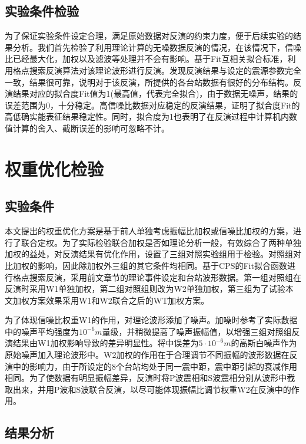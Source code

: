 \subsection{实验条件检验}
为了保证实验条件设定合理，满足原始数据对反演的约束力度，便于后续实验的结果分析。我们首先检验了利用理论计算的无噪数据反演的情况，在该情况下，信噪比已经最大化，加权以及滤波等处理并不会有影响。基于Fit互相关拟合标准，利用格点搜索反演算法对该理论波形进行反演。发现反演结果与设定的震源参数完全一致，结果很可靠，说明对于该反演，所提供的各台站数据有很好的分布结构。反演结果对应的拟合度Fit值为1(最高值，代表完全拟合)，由于数据无噪声，结果的误差范围为0，十分稳定。高信噪比数据对应稳定的反演结果，证明了拟合度Fit的高低确实能表征结果稳定性。同时，拟合度为1也表明了在反演过程中计算机内数值计算的舍入、截断误差的影响可忽略不计。

\section{权重优化检验}

\subsection{实验条件}
本文提出的权重优化方案是基于前人单独考虑振幅比加权或信噪比加权的方案，进行了联合定权。为了实际检验联合加权是否如理论分析一般，有效综合了两种单独加权的益处，对反演结果有优化作用，设置了三组对照实验组用于检验。对照组对比加权的影响，因此除加权外三组的其它条件均相同。基于CPS的Fit拟合函数进行格点搜索反演，采用前文章节的理论事件设定和台站波形数据。第一组对照组在反演时采用W1单独加权，第二组对照组则改为W2单独加权，第三组为了试验本文加权方案效果采用W1和W2联合之后的WT加权方案。

为了体现信噪比权重W1的作用，对理论波形添加了噪声。加噪时参考了实际数据中的噪声平均强度为$10^{-6}m$量级，并稍微提高了噪声振幅值，以增强三组对照组反演结果由W1加权影响导致的差异明显性。将中误差为$5\cdot10^{-6}m$的高斯白噪声作为原始噪声加入理论波形中。W2加权的作用在于合理调节不同振幅的波形数据在反演中的影响力，由于所设定的8个台站均处于同一震中距，震中距引起的衰减作用相同。为了使数据有明显振幅差异，反演时将P波震相和S波震相分别从波形中截取出来，并用P波和S波联合反演，以尽可能体现振幅比调节权重W2在反演中的作用。

\subsection{结果分析}

